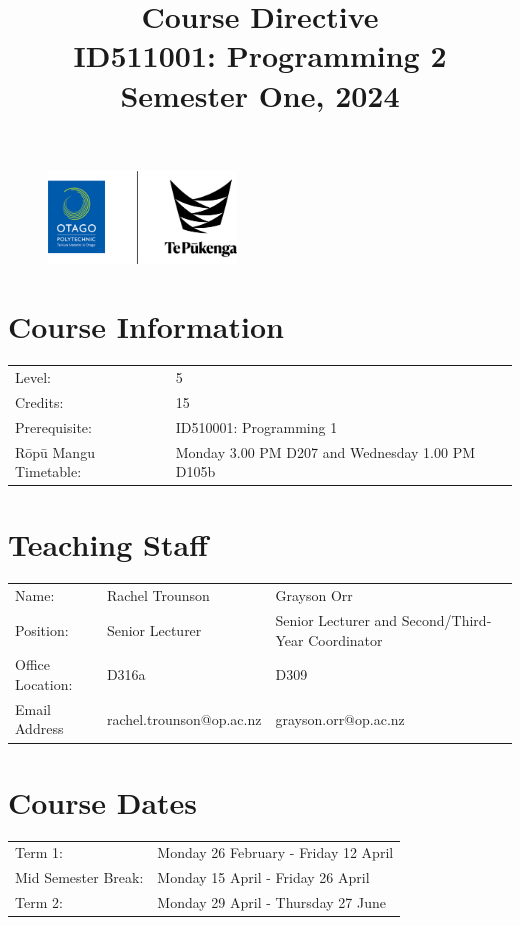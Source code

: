 \documentclass{article}
\author{}
\begin{document}
\begin{figure}
	\centering
	\includegraphics[width=50mm]{../img/logo.png}
\end{figure}

\title{Course Directive\\ID511001: Programming 2\\Semester One, 2024}
\date{}
\maketitle

\section*{Course Information}
\begin{tabular}{ll}
	Level:        & 5 \\
	Credits:      & 15                                                             \\
	Prerequisite: & ID510001: Programming 1                                  \\
	Rōpū Mangu Timetable:    & Monday 3.00 PM D207 and Wednesday 1.00 PM D105b  \\
\end{tabular}

\section*{Teaching Staff} 
\begin{tabular}{lll}
	Name:             & Rachel Trounson & Grayson Orr                       \\
	Position:        & Senior Lecturer  & Senior Lecturer and Second/Third-Year Coordinator \\
	Office Location: & D316a  &          D309                         \\
	Email Address    &  rachel.trounson@op.ac.nz  &  grayson.orr@op.ac.nz                \\
\end{tabular} 

\section*{Course Dates}
\begin{tabular}{ll}
	Term 1:           & Monday 26 February - Friday 12 April  \\
	Mid Semester Break: &  Monday 15 April  - Friday 26 April     \\
	Term 2:             & Monday 29 April - Thursday 27 June       \\
\end{tabular}
\end{document}
